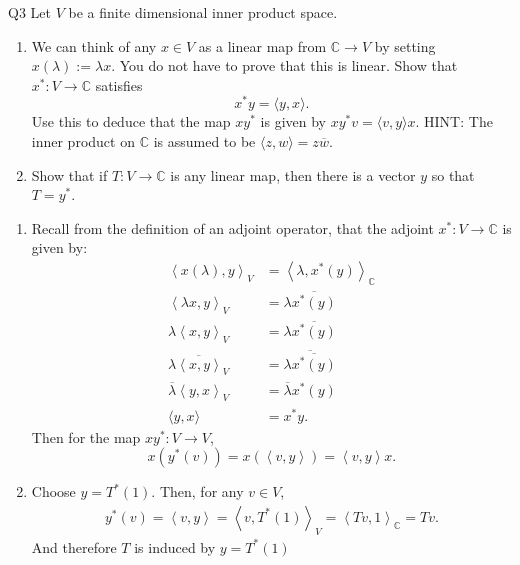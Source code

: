 \documentclass{article}
\begin{document}
\begin{prob}{Q3}
Let $V$ be a finite dimensional inner product space.
\begin{enumerate}[label= (\alph*)] 
\item We can think of any $x \in V$ as a linear map from $\mathbb{C} \to V$ by setting $x(\lambda) := \lambda x$. You do not have to prove that this is linear. Show that $x^*: V \to \mathbb{C}$ satisfies
$$x^* y = \langle y, x\rangle.$$
Use this to deduce that the map $xy^*$ is given by $xy^* v = \langle v, y\rangle x$.
HINT: The inner product on $\mathbb{C}$ is assumed to be $\langle z, w\rangle = z\overline{w}$.
\item Show that if $T: V \to \mathbb{C}$ is any linear map, then there is a vector $y$ so that $T = y^*$.
\end{enumerate}
\end{prob}
\begin{enumerate}[label= (\alph*)] 
    \item Recall from the definition of an adjoint operator, that the adjoint $x^* :V\to \mathbb{C}$ is given by:
        \begin{align*}
            \left< x(\lambda),y \right>_V &=\left<\lambda,x^* (y) \right>_{\mathbb{C}}\\
            \left<\lambda x,y \right>_V&= \lambda \overline{x^* (y)} \\
            \lambda\left< x,y \right>_V&= \lambda \overline{x^* (y)} \\
            \overline{\lambda\left< x,y \right>_V}&= \overline{\lambda \overline{x^* (y)}} \\
            \overline{\lambda}\left< y,x \right>_V&= \overline{\lambda} {x^* (y)} \\
            \langle y, x\rangle&= x^* y
        .\end{align*}
        Then for the map $xy^* :V\to V$, 
        \[
            x(y^* (v))=x(\left<v,y \right>)=\left<v,y \right> x
        .\] 
    \item Choose $y=T^* (1).$ Then, for any $v\in V$, 
        \begin{align*}
            y^* (v)=\left<v,y \right>=\left<v,T^* (1) \right>_V = \left<Tv,1 \right>_{\mathbb{C}}=Tv
        .\end{align*}
        And therefore $T$ is induced by $y=T^* (1)$
\end{enumerate}
\end{document}
